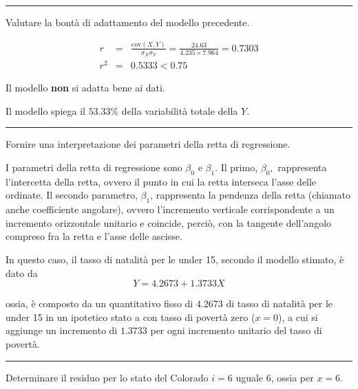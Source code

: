 \documentclass[
  11pt,
]{book}
\theoremstyle{mytheoremstyle}
\theoremstyle{mydefstyle}
\newenvironment{sol}
  {
  \begin{tcolorbox}[enhanced,breakable,arc=0.1mm,boxrule=1pt,colback=white,colframe=iblue,
  title=\bf \fontfamily{lmss}\selectfont \hspace{.5 cm} Soluzione,drop fuzzy shadow]

}{
\end{tcolorbox}
  }
\begin{document}
\begin{center}\rule{0.5\linewidth}{0.5pt}\end{center}

Valutare la bontà di adattamento del modello precedente.

\begin{sol}
\begin{eqnarray*}
r&=&\frac{\text{cov}(X,Y)}{\sigma_X\sigma_Y}=\frac{ 24.63 }{ 4.235 \times 7.964 }= 0.7303 \\ 
r^2&=& 0.5333 < 0.75
\end{eqnarray*}

Il modello \textbf{non} si adatta bene ai dati.

Il modello spiega il \(53.33\%\) della variabilità totale della \(Y\).

\end{sol}

\begin{center}\rule{0.5\linewidth}{0.5pt}\end{center}

Fornire una interpretazione dei parametri della retta di regressione.

\begin{sol}
I parametri della retta di regressione sono \(\beta_{0}\) e \(\beta_{1}\).
Il primo, \(\beta_{0},\) rappresenta l'intercetta della retta,
ovvero il punto in cui la retta interseca l'asse delle ordinate.
Il secondo parametro, \(\beta_{1}\), rappresenta la pendenza della
retta (chiamato anche coefficiente angolare), ovvero l'incremento
verticale corrispondente a un incremento orizzontale unitario e
coincide, perciò, con la tangente dell'angolo compreso fra la
retta e l'asse delle ascisse.

In questo caso, il tasso di natalità per le under 15,
secondo il modello stimato, è dato da
\[Y= 4.2673 + 1.3733 X\]

ossia, è composto da un quantitativo fisso di \(4.2673\) di tasso di natalità per le under 15 in un ipotetico stato a con tasso di povertà zero (\(x=0\)), a cui si aggiunge un incremento di \(1.3733\) per ogni incremento unitario del tasso di povertà.

\end{sol}

\begin{center}\rule{0.5\linewidth}{0.5pt}\end{center}

Determinare il residuo per lo stato del Colorado \(i=6\)
uguale 6, ossia per \(x=6\).
\end{document}
